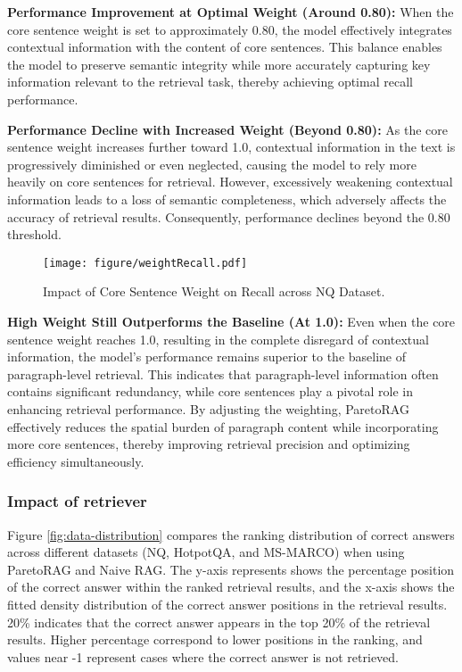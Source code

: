\textbf{Performance Improvement at Optimal Weight (Around 0.80):} When the core sentence weight is set to approximately 0.80, the model effectively integrates contextual information with the content of core sentences. This balance enables the model to preserve semantic integrity while more accurately capturing key information relevant to the retrieval task, thereby achieving optimal recall performance.

\textbf{Performance Decline with Increased Weight (Beyond 0.80):} As the core sentence weight increases further toward 1.0, contextual information in the text is progressively diminished or even neglected, causing the model to rely more heavily on core sentences for retrieval. However, excessively weakening contextual information leads to a loss of semantic completeness, which adversely affects the accuracy of retrieval results. Consequently, performance declines beyond the 0.80 threshold.

\begin{figure}[ht!]
    \centering
    \texttt{[image: figure/weightRecall.pdf]}
    \caption{Impact of Core Sentence Weight on Recall across NQ Dataset.}
    \label{fig:the influence of core sentence weight between different retrievers}
\end{figure}


\textbf{High Weight Still Outperforms the Baseline (At 1.0):} Even when the core sentence weight reaches 1.0, resulting in the complete disregard of contextual information, the model's performance remains superior to the baseline of paragraph-level retrieval. This indicates that paragraph-level information often contains significant redundancy, while core sentences play a pivotal role in enhancing retrieval performance. By adjusting the weighting, ParetoRAG effectively reduces the spatial burden of paragraph content while incorporating more core sentences, thereby improving retrieval precision and optimizing efficiency simultaneously.


\subsubsection{Impact of retriever} 
\label{sec:impact-of-retriever}
Figure \ref{fig:data-distribution} compares the ranking distribution of correct answers across different datasets (NQ, HotpotQA, and MS-MARCO) when using ParetoRAG and Naive RAG. The y-axis represents shows the percentage position of the correct answer within the ranked retrieval results, and the x-axis shows the fitted density distribution of the correct answer positions in the retrieval results. 20\% indicates that the correct answer appears in the top 20\% of the retrieval results. Higher percentage correspond to lower positions in the ranking, and values near -1 represent cases where the correct answer is not retrieved.


